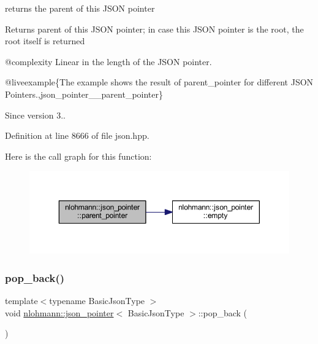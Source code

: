 returns the parent of this J\+S\+ON pointer 

\begin{DoxyReturn}{Returns}
parent of this J\+S\+ON pointer; in case this J\+S\+ON pointer is the root, the root itself is returned
\end{DoxyReturn}
@complexity Linear in the length of the J\+S\+ON pointer.

@liveexample\{The example shows the result of {\ttfamily parent\+\_\+pointer} for different J\+S\+ON Pointers.,json\+\_\+pointer\+\_\+\+\_\+parent\+\_\+pointer\}

\begin{DoxySince}{Since}
version 3.. 
\end{DoxySince}


Definition at line 8666 of file json.\+hpp.

Here is the call graph for this function\+:
\nopagebreak
\begin{figure}[H]
\begin{center}
\leavevmode
\includegraphics[width=350pt]{classnlohmann_1_1json__pointer_afdaacce1edb7145e0434e014f0e8685a_cgraph}
\end{center}
\end{figure}
\mbox{\label{classnlohmann_1_1json__pointer_a4b1ee4d511ca195bed896a3da47e264c}} 
\subsubsection{\texorpdfstring{pop\_back()}{pop\_back()}}
{\footnotesize\ttfamily template$<$typename Basic\+Json\+Type $>$ \\
void \mbox{\hyperlink{classnlohmann_1_1json__pointer}{nlohmann\+::json\+\_\+pointer}}$<$ Basic\+Json\+Type $>$\+::pop\+\_\+back (\begin{DoxyParamCaption}{ }\end{DoxyParamCaption})\hspace{0.3cm}{\ttfamily [inline]}}



